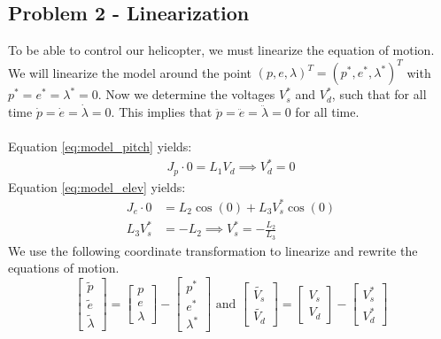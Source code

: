 \subsection{Problem 2 - Linearization}\label{subsec:P1p2}
To be able to control our helicopter, we must linearize the equation of motion. We will linearize the model around the point $(p,e,\lambda)^T=(p^*,e^*,\lambda^*)^T$ with $p^*=e^*=\lambda^*=0$. Now we determine the voltages $V_s^*$ and $V_d^*$, such that for all time $\dot{p} = \dot{e} = \dot{\lambda} = 0$. 
This implies that $\ddot{p} = \ddot{e} = \ddot{\lambda} = 0$ for all time. \\
\\Equation \eqref{eq:model_pitch} yields:
\begin{align}
    J_p \cdot 0 = L_1 V_d \implies V_d^* = 0
\end{align}
Equation \eqref{eq:model_elev} yields:
\begin{align}
    J_e \cdot 0 &= L_2 \cos(0) + L_3 V_s^* \cos(0) \nonumber \\
    L_3 V_s^* &= - L_2 \implies V_s^* = -\frac{L_2}{L_3}\label{eq:vs_tilde}
\end{align}
We use the following coordinate transformation to linearize and rewrite the equations of motion. 
\begin{equation}\label{eq: coord_trans}
    \begin{bmatrix} 
        \tilde{p} \\ \tilde{e} \\ \tilde{\lambda}
    \end{bmatrix}
    =
    \begin{bmatrix} 
        p \\ e \\ \lambda
    \end{bmatrix}
    -
    \begin{bmatrix} 
        p^* \\ e^* \\ \lambda^*
    \end{bmatrix}
    \text{ and }
    \begin{bmatrix}
        \tilde{V_s} \\ \tilde{V_d}
    \end{bmatrix}
    =
    \begin{bmatrix}
        V_s \\ V_d
    \end{bmatrix}
    -
    \begin{bmatrix}
        V_s^* \\ V_d^*
    \end{bmatrix}
\end{equation}
